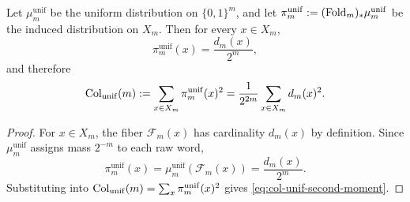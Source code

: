 \begin{proposition}\label{prop:uniform-collision}
Let $\mu_m^{\mathrm{unif}}$ be the uniform distribution on $\{0,1\}^m$, and let $\pi_m^{\mathrm{unif}}:=(\mathrm{Fold}_m)_*\mu_m^{\mathrm{unif}}$ be the induced distribution on $X_m$. Then for every $x\in X_m$,
\[
\pi_m^{\mathrm{unif}}(x)=\frac{d_m(x)}{2^m},
\]
and therefore
\begin{equation}\label{eq:col-unif-second-moment}
\mathrm{Col}_{\mathrm{unif}}(m):=\sum_{x\in X_m}\pi_m^{\mathrm{unif}}(x)^2
=\frac{1}{2^{2m}}\sum_{x\in X_m} d_m(x)^2.
\end{equation}
\end{proposition}

\begin{proof}
For $x\in X_m$, the fiber $\mathcal{F}_m(x)$ has cardinality $d_m(x)$ by definition. Since $\mu_m^{\mathrm{unif}}$ assigns mass $2^{-m}$ to each raw word,
\[
\pi_m^{\mathrm{unif}}(x)=\mu_m^{\mathrm{unif}}(\mathcal{F}_m(x))=\frac{d_m(x)}{2^m}.
\]
Substituting into $\mathrm{Col}_{\mathrm{unif}}(m)=\sum_x \pi_m^{\mathrm{unif}}(x)^2$ gives \eqref{eq:col-unif-second-moment}.
\end{proof}

